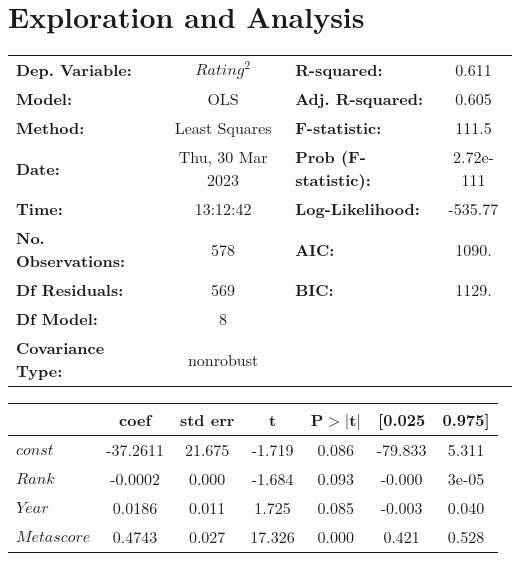 \section{Exploration and Analysis}
    \begin{center}
\begin{tabular}{lclc}
\toprule
\textbf{Dep. Variable:}       &     $Rating^2$     & \textbf{  R-squared:         } &     0.611   \\
\textbf{Model:}               &       OLS        & \textbf{  Adj. R-squared:    } &     0.605   \\
\textbf{Method:}              &  Least Squares   & \textbf{  F-statistic:       } &     111.5   \\
\textbf{Date:}                & Thu, 30 Mar 2023 & \textbf{  Prob (F-statistic):} & 2.72e-111   \\
\textbf{Time:}                &     13:12:42     & \textbf{  Log-Likelihood:    } &   -535.77   \\
\textbf{No. Observations:}    &         578      & \textbf{  AIC:               } &     1090.   \\
\textbf{Df Residuals:}        &         569      & \textbf{  BIC:               } &     1129.   \\
\textbf{Df Model:}            &           8      & \textbf{                     } &             \\
\textbf{Covariance Type:}     &    nonrobust     & \textbf{                     } &             \\
\bottomrule
\end{tabular}
\begin{tabular}{lcccccc}
                              & \textbf{coef} & \textbf{std err} & \textbf{t} & \textbf{P$> |$t$|$} & \textbf{[0.025} & \textbf{0.975]}  \\
\midrule
\textbf{$const$}                &     -37.2611  &       21.675     &    -1.719  &         0.086        &      -79.833    &        5.311     \\
\textbf{$Rank$}                 &      -0.0002  &        0.000     &    -1.684  &         0.093        &       -0.000    &        3e-05     \\
\textbf{$Year$}                 &       0.0186  &        0.011     &     1.725  &         0.085        &       -0.003    &        0.040     \\
\textbf{$Metascore$}            &       0.4743  &        0.027     &    17.326  &         0.000        &        0.421    &        0.528     \\

\end{tabular}
\end{center}
